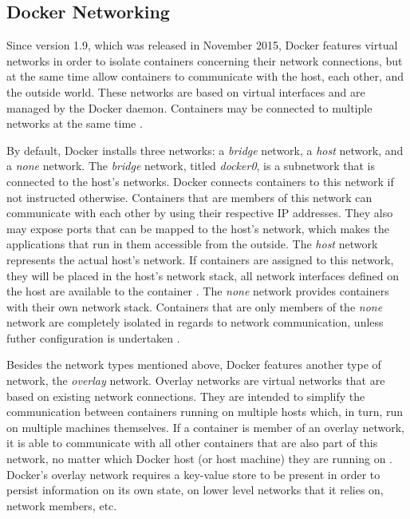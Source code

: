   \subsection{Docker Networking} %
  \label{sub:docker_networks}
    Since version 1.9, which was released in November 2015, Docker features virtual networks in order to isolate containers concerning their network connections, but at the same time allow containers to communicate with the host, each other, and the outside world. These networks are based on virtual interfaces and are managed by the Docker daemon. Containers may be connected to multiple networks at the same time \cite{Docker????Dockera}.

    By default, Docker installs three networks: a \emph{bridge} network, a \emph{host} network, and a \emph{none} network.
    The \emph{bridge} network, titled \emph{docker0}, is a subnetwork that is connected to the host's networks. Docker connects containers to this network if not instructed otherwise. Containers that are members of this network can communicate with each other by using their respective \ac{IP} addresses. They also may expose ports that can be mapped to the host's network, which makes the applications that run in them accessible from the outside.
    The \emph{host} network represents the actual host's network. If containers are assigned to this network, they will be placed in the host's network stack, \ie all network interfaces defined on the host are available to the container \cite{Docker????Dockera}.
    The \emph{none} network provides containers with their own network stack. Containers that are only members of the \emph{none} network are completely isolated in regards to network communication, unless futher configuration is undertaken \cite{Docker????Dockera}.

    Besides the network types mentioned above, Docker features another type of network, the \emph{overlay} network. Overlay networks are virtual networks that are based on existing network connections. They are intended to simplify the communication between containers running on multiple hosts which, in turn, run on multiple machines themselves. If a container is member of an overlay network, it is able to communicate with all other containers that are also part of this network, no matter which Docker host (or host machine) they are running on \cite{Docker????Dockera}. \\
    Docker's overlay network requires a key-value store to be present in order to persist information on its own state, \eg on lower level networks that it relies on, network members, etc.

